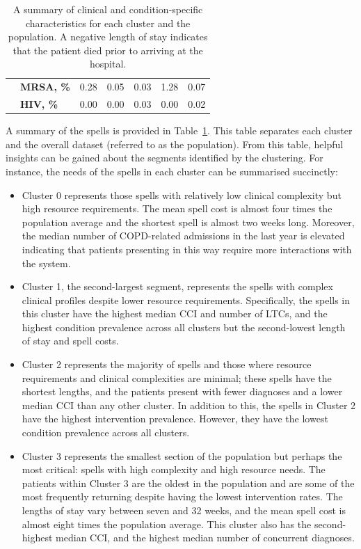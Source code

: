 \documentclass[11pt]{article}
\begin{document}
\begin{table}
{\begin{tabular}{llrrrrr}
               & \textbf{MRSA, \%} &     0.28 &     0.05 &     0.03 &      1.28 &       0.07 \\
               & \textbf{HIV, \%} &     0.00 &     0.00 &     0.03 &      0.00 &       0.02 \\
        \bottomrule
        \end{tabular}
    }\caption{%
        A summary of clinical and condition-specific characteristics for each
        cluster and the population. A negative length of stay indicates that the
        patient died prior to arriving at the hospital.
    }\label{tab:summary}
\end{table}

A summary of the spells is provided in Table~\ref{tab:summary}. This table
separates each cluster and the overall dataset (referred to as the population).
From this table, helpful insights can be gained about the segments identified by
the clustering. For instance, the needs of the spells in each cluster can be
summarised succinctly:
\begin{itemize}
    \item Cluster 0 represents those spells with relatively low clinical
        complexity but high resource requirements. The mean spell cost is almost
        four times the population average and the shortest spell is almost two
        weeks long. Moreover, the median number of COPD-related admissions in
        the last year is elevated indicating that patients presenting in this
        way require more interactions with the system.
    \item Cluster 1, the second-largest segment, represents the spells with
        complex clinical profiles despite lower resource requirements.
        Specifically, the spells in this cluster have the highest median CCI and
        number of LTCs, and the highest condition prevalence across all clusters
        but the second-lowest length of stay and spell costs.
    \item Cluster 2 represents the majority of spells and those where resource
        requirements and clinical complexities are minimal; these spells have
        the shortest lengths, and the patients present with fewer diagnoses and
        a lower median CCI than any other cluster. In addition to this, the
        spells in Cluster 2 have the highest intervention prevalence. However,
        they have the lowest condition prevalence across all clusters.
    \item Cluster 3 represents the smallest section of the population but
        perhaps the most critical: spells with high complexity and high resource
        needs. The patients within Cluster 3 are the oldest in the population
        and are some of the most frequently returning despite having the lowest
        intervention rates. The lengths of stay vary between seven and 32 weeks,
        and the mean spell cost is almost eight times the population average.
        This cluster also has the second-highest median CCI, and the highest
        median number of concurrent diagnoses.
\end{itemize}
\end{document}

